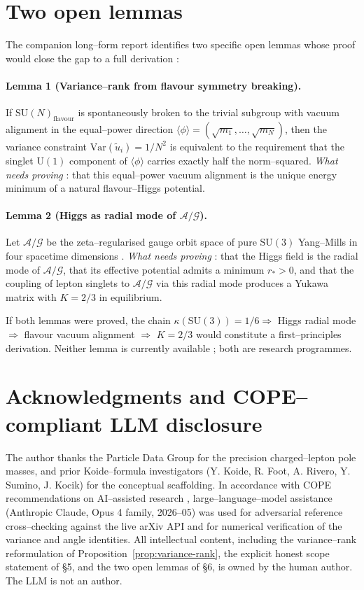 \documentclass[11pt,a4paper]{article}
\theoremstyle{remark}
\begin{document}
\section{Two open lemmas}

The companion long--form report \cite{Remondiere2026deriv} identifies two specific open lemmas whose proof would close the gap to a full derivation :

\paragraph{Lemma 1 (Variance--rank from flavour symmetry breaking).} If $\mathrm{SU}(N)_{\mathrm{flavour}}$ is spontaneously broken to the trivial subgroup with vacuum alignment in the equal--power direction $\langle \phi \rangle = (\sqrt{m_1}, \ldots, \sqrt{m_N})$, then the variance constraint $\mathrm{Var}(\tilde u_i) = 1/N^2$ is equivalent to the requirement that the singlet $\mathrm{U}(1)$ component of $\langle \phi \rangle$ carries exactly half the norm--squared. \emph{What needs proving} : that this equal--power vacuum alignment is the unique energy minimum of a natural flavour--Higgs potential.

\paragraph{Lemma 2 (Higgs as radial mode of $\mathcal{A}/\mathcal{G}$).} Let $\mathcal{A}/\mathcal{G}$ be the zeta--regularised gauge orbit space of pure $\mathrm{SU}(3)$ Yang--Mills in four spacetime dimensions \cite{Singer1981, YangHartnoll2018}. \emph{What needs proving} : that the Higgs field is the radial mode of $\mathcal{A}/\mathcal{G}$, that its effective potential admits a minimum $r_* > 0$, and that the coupling of lepton singlets to $\mathcal{A}/\mathcal{G}$ via this radial mode produces a Yukawa matrix with $K = 2/3$ in equilibrium.

If both lemmas were proved, the chain $\kappa(\mathrm{SU}(3)) = 1/6 \Rightarrow$ Higgs radial mode $\Rightarrow$ flavour vacuum alignment $\Rightarrow$ $K = 2/3$ would constitute a first--principles derivation. Neither lemma is currently available ; both are research programmes.

\section*{Acknowledgments and COPE--compliant LLM disclosure}

The author thanks the Particle Data Group for the precision charged--lepton pole masses, and prior Koide--formula investigators (Y. Koide, R. Foot, A. Rivero, Y. Sumino, J. Kocik) for the conceptual scaffolding. In accordance with COPE recommendations on AI--assisted research \cite{COPE2023}, large--language--model assistance (Anthropic Claude, Opus 4 family, 2026--05) was used for adversarial reference cross--checking against the live arXiv API and for numerical verification of the variance and angle identities. All intellectual content, including the variance--rank reformulation of Proposition~\ref{prop:variance-rank}, the explicit honest scope statement of \S 5, and the two open lemmas of \S 6, is owned by the human author. The LLM is not an author.
\end{document}
